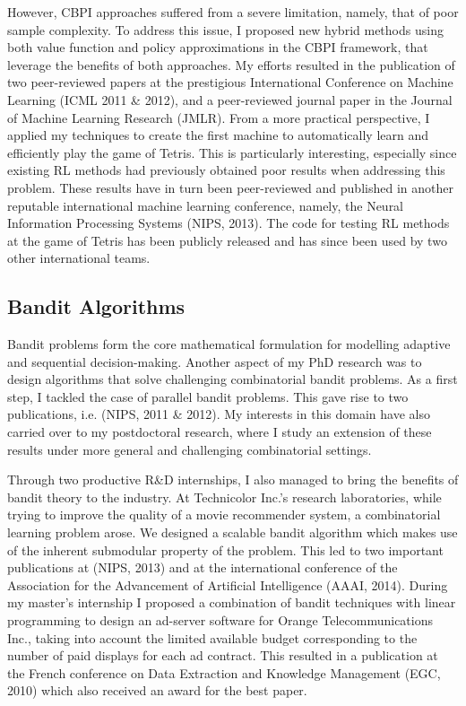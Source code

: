 However, CBPI approaches suffered from a severe limitation, namely, that of poor sample complexity. To address this issue, I proposed new hybrid methods using both value function and policy approximations in the CBPI framework, that leverage the benefits of both approaches. My efforts resulted in the publication of two peer-reviewed papers at the prestigious International Conference on Machine Learning (ICML 2011 \& 2012), and a peer-reviewed journal paper in the Journal of Machine Learning Research (JMLR). From a more practical perspective, I applied my techniques to create the first machine to automatically learn and efficiently play the game of Tetris. This is particularly interesting, especially since existing RL methods had previously obtained poor results when addressing this problem. These results have in turn been peer-reviewed and published in another reputable international machine learning conference, namely, the Neural Information Processing Systems (NIPS, 2013). The code for testing RL methods at the game of Tetris has been publicly released and has since been used by two other international teams.
\subsection{Bandit Algorithms}
Bandit problems form the core mathematical formulation for modelling adaptive and sequential decision-making. Another aspect of my PhD research was to design algorithms that solve challenging combinatorial bandit problems. As a first step, I tackled the case of parallel bandit problems. This gave rise to two publications, i.e. (NIPS, 2011 \& 2012). My interests in this domain have also carried over to my postdoctoral research, where I study an extension of these results under more general and challenging combinatorial settings. 

Through two productive R\&D internships, I also managed to bring the benefits of bandit theory to the industry. 
At Technicolor Inc.'s research laboratories, while trying to improve the quality of a movie recommender system, a combinatorial learning problem arose. We designed a scalable bandit algorithm which makes use of the inherent submodular property of the problem. This led to two important publications at (NIPS, 2013) and at the international conference of the Association for the Advancement of Artificial Intelligence (AAAI, 2014). During my master's internship I proposed a combination of bandit techniques with linear programming to design an ad-server software for Orange Telecommunications Inc., taking into account the limited available budget corresponding to the number of paid displays for each ad contract. This resulted in a publication at the 
French conference on Data Extraction and Knowledge Management (EGC, 2010) which also received an award for the best paper. 

